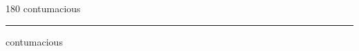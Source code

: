 
\begin{frame}
\begin{center}
\begin{turn}{180}
{\fontsize{2.5cm}{1em}\selectfont contumacious}
\end{turn}
\vspace{1em}\par  
\hrule
\vspace{1em}\par  
{\fontsize{2.5cm}{1em}\selectfont contumacious}
\end{center}
\end{frame}
